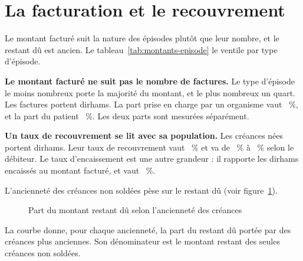 \section{La facturation et le recouvrement}

Le montant facturé suit la nature des épisodes plutôt que leur nombre, et le restant dû est ancien.
Le tableau~\ref{tab:montants-episode} le ventile par type d'épisode.

\textbf{Le montant facturé ne suit pas le nombre de factures.} Le type d'épisode le
moins nombreux porte la majorité du montant, et le plus nombreux un quart. Les
 factures portent  dirhams. La part
prise en charge par un organisme vaut ~\%, et la part du
patient ~\%. Les deux parts sont mesurées séparément.

\textbf{Un taux de recouvrement se lit avec sa population.} Les
 créances nées portent  dirhams. Leur
taux de recouvrement vaut ~\% et va de
~\% à ~\% selon
le débiteur. Le taux d'encaissement est une autre grandeur : il rapporte les
 dirhams encaissés au montant facturé, et vaut
~\%.

L'ancienneté des créances non soldées pèse sur le restant dû (voir
figure~\ref{fig:anciennete-creances}).

\begin{figure}[htbp]
\centering
{}
\caption{Part du montant restant dû selon l'ancienneté des créances}\label{fig:anciennete-creances}
\end{figure}

La courbe donne, pour chaque ancienneté, la part du restant dû portée par des créances plus
anciennes. Son dénominateur est le montant restant des seules créances non soldées.

